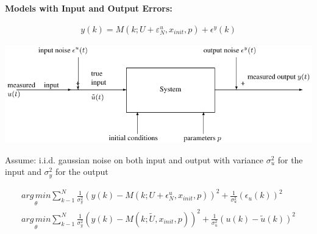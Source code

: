 \begin{tcolorbox}[colback=purple!5!white,colframe=purple!75!black,title=\textbf{Pure Output Error (OE) Minimization}]
	\textbf{Models with Input and Output Errors:}
	
	\begin{align*}
	y(k)=M(k;U + \varepsilon_{N}^{u}, x_{init}, p) + \epsilon^y(k)
	\end{align*}
	
	\includegraphics[width=\textwidth]{model.pdf}
	
	Assume: i.i.d. gaussian noise on both input and output with variance $\sigma_u^2$ for the input and $\sigma_y^2$ for the output
	
	\begin{align*}
	& \underset{\theta}{arg\,min} \sum_{k-1}^{N} \frac{1}{\sigma_{y}^{2}} (y(k)-M(k;U+ \epsilon_{N}^{u},x_{init},p))^2 + \frac{1}{\sigma_{u}^{2}} (\epsilon_u (k))^2 & \\
	& \underset{\theta}{arg\,min} \sum_{k-1}^{N} \frac{1}{\sigma_{y}^{2}} (y(k)-M(k;\tilde U, x_{init}, p))^2 + \frac{1}{\sigma_{u}^{2}} (u(k)-\tilde u(k) )^2 &
	\end{align*}
	
	
\end{tcolorbox}
